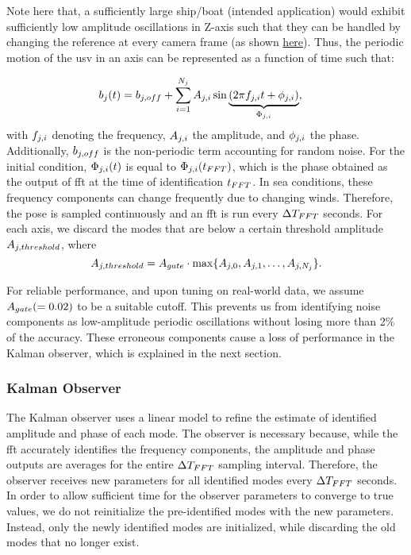 \documentclass[letterpaper, 10 pt, journal, twoside]{IEEEtran}
\begin{document}
Note here that, a sufficiently large ship/boat (intended application) would exhibit sufficiently low amplitude oscillations in Z-axis such that they can be handled by changing the reference at every camera frame (as shown \href{\medialink}{here}). Thus, the periodic motion of the \ac{usv} in an axis can be represented as a function of time such that:

\begin{equation}
\begin{aligned}
     b_j(t) &= b_{j,off} + \sum_{i=1}^{N_j}A_{j,i} \sin{\underbrace{(2\pi f_{j,i}t + \phi_{j,i})}_{\Phi_{j,i}}},
\end{aligned}
\end{equation}
\noindent with $f_{j,i}$ denoting the frequency, $A_{j,i}$ the amplitude, and $\phi_{j,i}$ the phase. Additionally, $b_{j,off}$ is the non-periodic term accounting for random noise. For the initial condition, $\Phi_{j,i}(t)$ is equal to $\Phi_{j,i}(t_{FFT})$, which is the phase obtained as the output of \ac{fft} at the time of identification $t_{FFT}$. 
In sea conditions, these frequency components can change frequently due to changing winds. Therefore, the pose is sampled continuously and an \ac{fft} is run every $\Delta T_{FFT}$ seconds. For each axis, we discard the modes that are below a certain threshold amplitude $A_{j,threshold}$, where
\begin{equation}
    A_{j,threshold} = A_{gate} \cdot \max\{A_{j,0}, A_{j,1}, \ldots, A_{j,N_j}\}.
\end{equation}

For reliable performance, and upon tuning on real-world data, we assume \(A_{gate} (=0.02)\) to be a suitable cutoff. This prevents us from identifying noise components as low-amplitude periodic oscillations without losing more than 2\% of the accuracy. These erroneous components cause a loss of performance in the Kalman observer, which is explained in the next section. 

\subsubsection{Kalman Observer}
The Kalman observer uses a linear model to refine the estimate of identified amplitude and phase of each mode. The observer is necessary because, while the \ac{fft} accurately identifies the frequency components, the amplitude and phase outputs are averages for the entire $\Delta T_{FFT}$ sampling interval. Therefore, the observer receives new parameters for all identified modes every $\Delta T_{FFT}$ seconds. In order to allow sufficient time for the observer parameters to converge to true values, we do not reinitialize the pre-identified modes with the new parameters. Instead, only the newly identified modes are initialized, while discarding the old modes that no longer exist.
\end{document}
